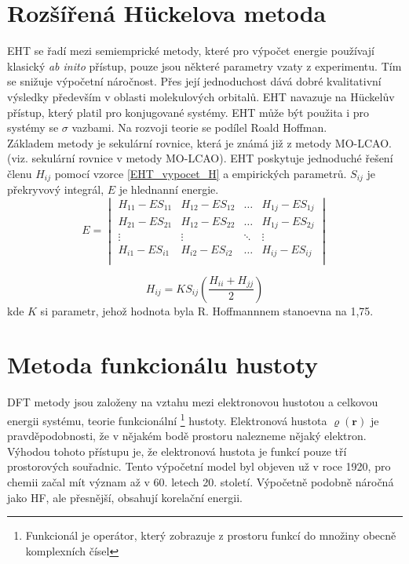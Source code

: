 \documentclass[
  digital, %
  table,   %
  lof,     %
  lot,     %
]{fithesis3}
\begin{document}
\section{Rozšířená Hückelova metoda}
EHT se řadí mezi semiemprické metody, které  pro výpočet energie používají klasický \textit{ab inito} přístup, pouze jsou některé parametry vzaty z experimentu. Tím se snižuje výpočetní náročnost. Přes její jednoduchost dává dobré kvalitativní výsledky především v oblasti molekulových orbitalů. EHT navazuje na Hückelův přístup, který platil pro konjugované systémy. EHT může být použita i pro systémy se $\sigma$ vazbami. Na rozvoji teorie se podílel Roald Hoffman. \cite{lowe2011quantum} \\
Základem metody je sekulární rovnice, která je známá již z metody MO-LCAO. (viz. sekulární rovnice v metody MO-LCAO). EHT poskytuje jednoduché řešení členu $H_{ij}$ pomocí vzorce \ref{EHT_vypocet_H} a empirických parametrů. $S_{ij}$ je překryvový integrál, $E$ je hlednanní energie.
\begin{equation}
E = \begin{vmatrix}
H_{11} - E S_{11} & H_{12} - E S_{12} & \dots & H_{1j} - E S_{1j} \\
H_{21} - E S_{21} & H_{12} - E S_{22} & \dots & H_{1j} - E S_{2j} \\
\vdots & \vdots &  \ddots & \vdots  \\
H_{i1} - E S_{i1} & H_{i2} - E S_{i2} & \dots & H_{ij} - E S_{ij} \\
\end{vmatrix}
\end{equation}


\begin{equation}
H_{ij} = K S_{ij} \left( \frac{H_{ii} + H_{jj}}{2} \right)
\label{EHT_vypocet_H}
\end{equation}
kde $K$ si parametr, jehož hodnota byla R. Hoffmannnem stanoevna na 1,75. 

\section{Metoda funkcionálu hustoty}
DFT metody jsou založeny na vztahu mezi elektronovou hustotou a celkovou energii systému, teorie funkcionální \footnote{Funkcionál je operátor, který zobrazuje z prostoru funkcí do množiny obecně komplexních čísel} hustoty. Elektronová hustota $\varrho(\pmb{r})$ je pravděpodobnosti, že v nějakém bodě prostoru nalezneme nějaký elektron.  Výhodou tohoto přístupu je, že elektronová hustota je funkcí pouze tří prostorových souřadnic. Tento výpočetní model byl objeven už v roce 1920, pro chemii začal mít význam až v 60. letech 20. století. Výpočetně podobně náročná jako HF, ale přesnější, obsahují korelační energii. \\
\end{document}
